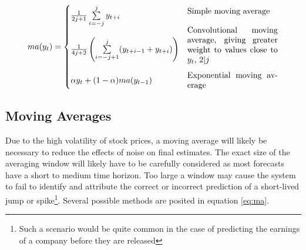 \begin{equation}
    ma(y_t) = \begin{cases}
    \frac{1}{2j+1} \sum\limits_{i=-j}^j y_{t+i} & \parbox{11em}{Simple moving average\\}\\
    \frac{1}{4j+2}\left(\sum\limits_{i=-j+1}^j (y_{t+i-1} + y_{t+i})\right) & \parbox{11em}{Convolutional moving average, giving greater weight to values close to $y_t$, $2|j$\\}\\
    \alpha y_t + (1-\alpha)ma(y_{t-1}) & \parbox{11em}{Exponential moving average}
    \end{cases}\label{eq:ma}
\end{equation}

\subsection{Moving Averages}
Due to the high volatility of stock prices, a moving average will likely be necessary to reduce the effects of noise on final estimates. The exact size of the averaging window will likely have to be carefully considered as most forecasts have a short to medium time horizon. Too large a window may cause the system to fail to identify and attribute the correct or incorrect prediction of a short-lived jump or spike\footnote{Such a scenario would be quite common in the case of predicting the earnings of a company before they are released}. Several possible methods are posited in equation \ref{eq:ma}.


\clearpage
